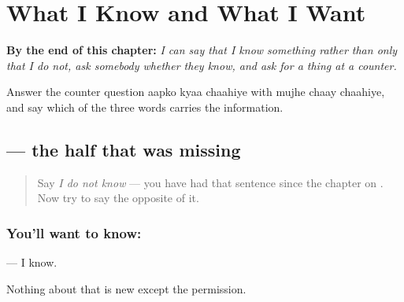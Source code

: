 
\chapter{What I Know and What I Want}
\label{ch:hi-chaah}

\begin{chapteropening}
\textbf{By the end of this chapter:} \emph{I can say that I know something rather than only that I do not, ask somebody whether they know, and ask for a thing at a counter.}

Answer the counter question aapko kyaa chaahiye with mujhe chaay chaahiye, and say which of the three words carries the information.
\end{chapteropening}

\section[\texorpdfstring{\hi{मैं} \hi{जानता} \hi{हूँ} (maiṁ jāntā hūṁ)}{मैं जानता हूँ (maiṁ jāntā hūṁ)}]{   — the half that was missing}

\label{lesson:HI-C95-jaanta-hun}



\begin{quote}
Say \emph{I do not know} — you have had that sentence since the chapter on \textbf{}. Now try to say the opposite of it.
\end{quote}

\subsection*{You'll want to know: }
\textbf{  } — I know.

Nothing about that is new except the permission.


